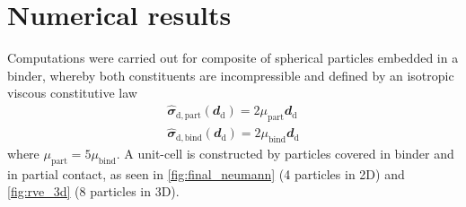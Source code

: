 \documentclass[12pt,a4paper]{article}
\renewcommand{\ts}[1]{\mathbfit{#1}}
\renewcommand{\dev}{\mathrm{d}}
\newcommand{\particle}{\mathrm{part}}
\begin{document}
\section{Numerical results}
\newcommand{\binder}{\mathrm{bind}}

Computations were carried out for composite of spherical particles embedded in a binder, whereby both constituents are incompressible and defined by an isotropic viscous constitutive law
\begin{align}
 \hat{\ts\sigma}_{\dev,\particle}(\ts d_\dev) = 2 \mu_\particle \ts d_\dev
\\
 \hat{\ts\sigma}_{\dev,\binder}(\ts d_\dev) = 2 \mu_\binder \ts d_\dev
\end{align}
where $\mu_\particle = 5\mu_\binder$.
A unit-cell is constructed by particles covered in binder and in partial contact, as seen in \cref{fig:final_neumann} (4 particles in 2D) and \cref{fig:rve_3d} (8 particles in 3D).

\end{document}
